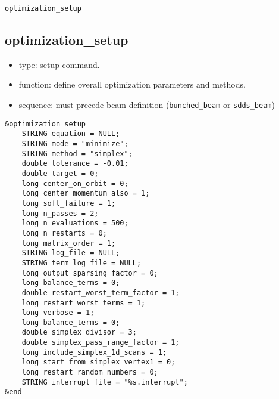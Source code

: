 \documentclass[11pt]{article}
\begin{document}
\newpage
\begin{center}{\Large\verb|optimization_setup|}\end{center}
\subsection{optimization\_setup \label{subsec:optimizationsetup}}

\begin{itemize}
\item type: setup command.
\item function: define overall optimization parameters and methods.
\item sequence: must precede beam definition (\verb|bunched_beam| or \verb|sdds_beam|)
\end{itemize}

\begin{verbatim}
&optimization_setup
    STRING equation = NULL;
    STRING mode = "minimize";
    STRING method = "simplex";
    double tolerance = -0.01;
    double target = 0;
    long center_on_orbit = 0;
    long center_momentum_also = 1;
    long soft_failure = 1;
    long n_passes = 2;
    long n_evaluations = 500; 
    long n_restarts = 0;
    long matrix_order = 1;
    STRING log_file = NULL;
    STRING term_log_file = NULL;
    long output_sparsing_factor = 0;
    long balance_terms = 0;
    double restart_worst_term_factor = 1;
    long restart_worst_terms = 1;
    long verbose = 1;
    long balance_terms = 0;
    double simplex_divisor = 3;
    double simplex_pass_range_factor = 1;
    long include_simplex_1d_scans = 1;
    long start_from_simplex_vertex1 = 0;
    long restart_random_numbers = 0;
    STRING interrupt_file = "%s.interrupt";
&end
\end{verbatim}
\end{document}
